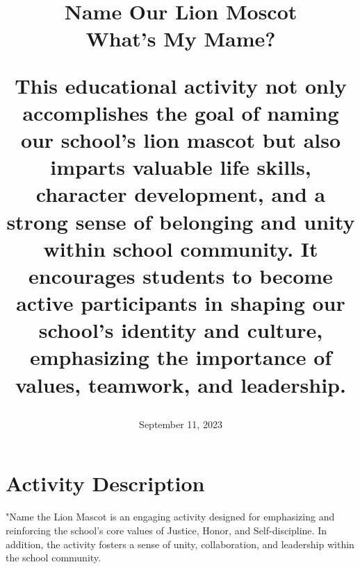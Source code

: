 \documentclass[14pt, letterpaper, twoside]{article}
\title{\textbf{Name Our Lion Moscot\\ What's My Mame?}
    \begin{spacing}{1.5} 
    This educational activity not only accomplishes the goal of naming our school's lion mascot but also imparts valuable life skills, character development, and a strong sense of belonging and unity within school community. It encourages students to become active participants in shaping our school's identity and 			culture, emphasizing the importance of values, teamwork, and leadership. 
    \end{spacing}}
\date{}
\author{September 11, 2023}
\begin{document}


\begin{titlepage}
  \maketitle 
  \thispagestyle{empty} 
\end{titlepage}

\pagestyle{headings}

\fancyhf{}
\fancyhead[R]{\thepage}
\pagestyle{fancy}
\renewcommand{\footrulewidth}{1 px}


\newpage
\tableofcontents
\thispagestyle{empty}
\newpage


\section{Activity Description}

	"Name the Lion Mascot is an engaging activity designed for emphasizing and reinforcing the school's core values of Justice, Honor, and Self-discipline. In addition, the activity fosters a sense of unity, collaboration, and leadership within the school community.
	
\end{document}
